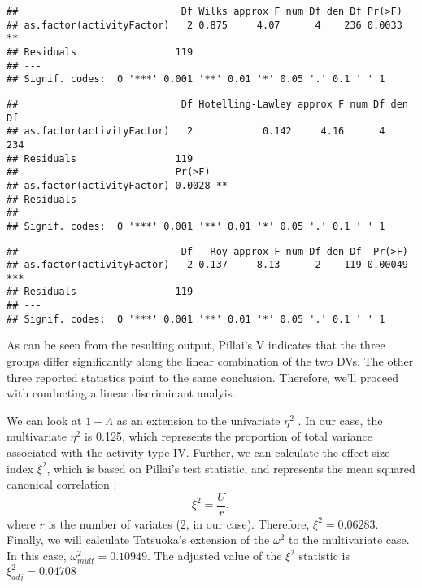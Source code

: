\documentclass[12pt,]{article}
\begin{document}
\begin{verbatim}
##                            Df Wilks approx F num Df den Df Pr(>F)   
## as.factor(activityFactor)   2 0.875     4.07      4    236 0.0033 **
## Residuals                 119                                       
## ---
## Signif. codes:  0 '***' 0.001 '**' 0.01 '*' 0.05 '.' 0.1 ' ' 1
\end{verbatim}

\begin{verbatim}
##                            Df Hotelling-Lawley approx F num Df den Df
## as.factor(activityFactor)   2            0.142     4.16      4    234
## Residuals                 119                                        
##                           Pr(>F)   
## as.factor(activityFactor) 0.0028 **
## Residuals                          
## ---
## Signif. codes:  0 '***' 0.001 '**' 0.01 '*' 0.05 '.' 0.1 ' ' 1
\end{verbatim}

\begin{verbatim}
##                            Df   Roy approx F num Df den Df  Pr(>F)    
## as.factor(activityFactor)   2 0.137     8.13      2    119 0.00049 ***
## Residuals                 119                                         
## ---
## Signif. codes:  0 '***' 0.001 '**' 0.01 '*' 0.05 '.' 0.1 ' ' 1
\end{verbatim}

As can be seen from the resulting output, Pillai's V indicates that the
three groups differ significantly along the linear combination of the
two DVs. The other three reported statistics point to the same
conclusion. Therefore, we'll proceed with conducting a linear
discriminant analyis.

We can look at \(1 - \Lambda\) as an extension to the univariate
\(\eta^2\) \citep{huberty_applied_2006}. In our case, the multivariate
\(\eta^2\) is 0.125, which represents the proportion of total variance
associated with the activity type IV. Further, we can calculate the
effect size index \(\xi^2\), which is based on Pillai's test statistic,
and represents the mean squared canonical correlation
\citep{huberty_applied_2006}: \[\xi^2 = \frac{U}{r},\] where \(r\) is
the number of variates (2, in our case). Therefore, \(\xi^2 = 0.06283\).
Finally, we will calculate Tatsuoka's
\citep[1970; according to][]{huberty_applied_2006} extension of the
\(\omega^2\) to the multivariate case. In this case,
\(\omega^2_{mult} = 0.10949\). The adjusted value of the \(\xi^2\)
statistic is \(\xi^2_{adj} = 0.04708\)
\end{document}
